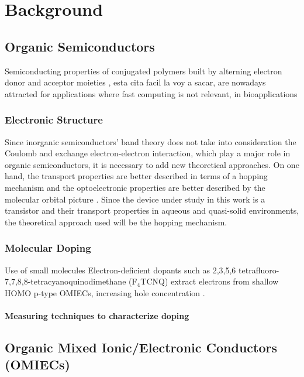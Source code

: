 {\chapter{Background}}
\label{sec:background}

\section{Organic Semiconductors}

Semiconducting properties of conjugated polymers built by alterning electron donor and acceptor moieties \cite{mattinenAtomicLayerDeposition2021}, esta cita facil la voy a sacar, are nowadays attracted for applications where fast computing is not relevant, in bioapplications


\subsection{Electronic Structure}

Since inorganic semiconductors' band theory does not take into consideration the Coulomb and exchange electron-electron interaction, which play a major role in organic semiconductors, it is necessary to add new theoretical approaches. On one hand, the transport properties are better described in terms of a hopping mechanism and the optoelectronic properties are better described by the molecular orbital picture \cite{alcacerElectronicStructureOrganic2018}. Since the device under study in this work is a transistor and their transport properties in aqueous and quasi-solid environments, the theoretical approach used will be the hopping mechanism.

\subsection{Molecular Doping}

Use of small molecules
Electron-deficient dopants such as 2,3,5,6 tetrafluoro-7,7,8,8-tetracyanoquinodimethane (F$_{4}$TCNQ) extract electrons from shallow HOMO p-type OMIECs, increasing hole concentration \cite{tanOrganicMixedIonic2022}.

\subsubsection{Measuring techniques to characterize doping}

\section{Organic Mixed Ionic/Electronic Conductors (OMIECs)}


